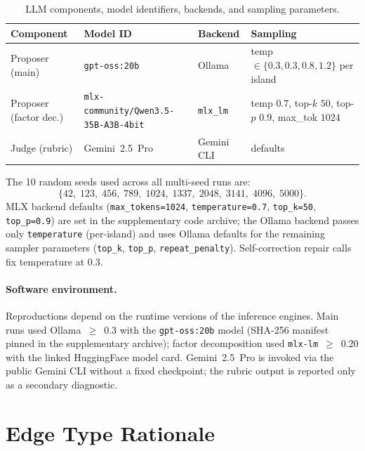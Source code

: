 \begin{table}[h]\centering\small
\caption{LLM components, model identifiers, backends, and sampling parameters.}\label{tab:llm-usage}
\begin{tabular}{p{2.3cm}p{3.8cm}p{1.4cm}p{4.2cm}}
\toprule
Component & Model ID & Backend & Sampling \\
\midrule
Proposer (main)        & \texttt{gpt-oss:20b}                            & Ollama       & temp $\in \{0.3, 0.3, 0.8, 1.2\}$ per island \\
Proposer (factor dec.) & \texttt{mlx-community/}\allowbreak\texttt{Qwen3.5-35B-A3B-4bit}     & \texttt{mlx\_lm} & temp $0.7$, top-$k$ $50$, top-$p$ $0.9$, max\_tok $1024$ \\
Judge (rubric)         & Gemini~2.5~Pro                                  & Gemini CLI   & defaults \\
\bottomrule
\end{tabular}
\end{table}

\noindent The 10 random seeds used across all multi-seed runs are:
\[
  \{42,\; 123,\; 456,\; 789,\; 1024,\; 1337,\; 2048,\; 3141,\; 4096,\; 5000\}.
\]
MLX backend defaults
(\texttt{max\_tokens=1024}, \texttt{temperature=0.7}, \texttt{top\_k=50},
\texttt{top\_p=0.9}) are set in the supplementary code archive; the
Ollama backend passes only \texttt{temperature} (per-island) and uses
Ollama defaults for the remaining sampler parameters (\texttt{top\_k},
\texttt{top\_p}, \texttt{repeat\_penalty}).  Self-correction repair
calls fix temperature at $0.3$.

\paragraph{Software environment.}
Reproductions depend on the runtime versions of the inference engines.
Main runs used Ollama~$\geq$~0.3 with the \texttt{gpt-oss:20b} model
(SHA-256 manifest pinned in the supplementary archive); factor
decomposition used \texttt{mlx-lm}~$\geq$~0.20 with the linked
HuggingFace model card.  Gemini~2.5~Pro is invoked via the public Gemini
CLI without a fixed checkpoint; the rubric output is reported only as a
secondary diagnostic.

\section{Edge Type Rationale}\label{app:edge-type-rationale}


